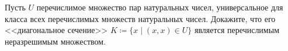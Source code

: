 Пусть $U$ перечислимое множество пар натуральных чисел, универсальное для класса всех перечислимых
множеств натуральных чисел. Докажите, что его <<диагональное сечение>>
$K \coloneqq \{x \mid (x, x) \in U\}$ является перечислимым неразрешимым множеством.
